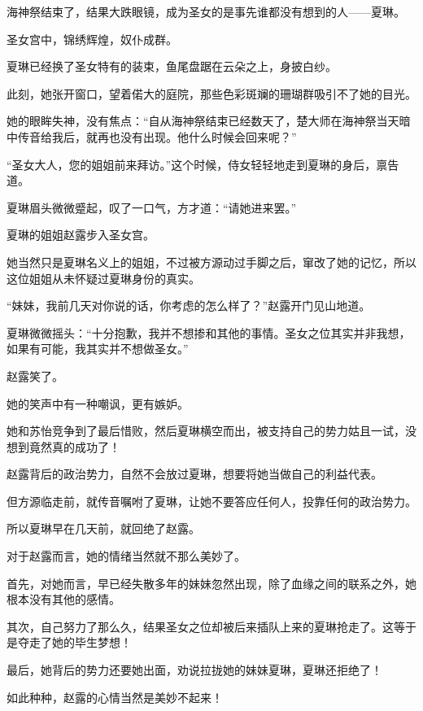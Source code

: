 
\begin{this_body}

海神祭结束了，结果大跌眼镜，成为圣女的是事先谁都没有想到的人——夏琳。

圣女宫中，锦绣辉煌，奴仆成群。

夏琳已经换了圣女特有的装束，鱼尾盘踞在云朵之上，身披白纱。

此刻，她张开窗口，望着偌大的庭院，那些色彩斑斓的珊瑚群吸引不了她的目光。

她的眼眸失神，没有焦点：“自从海神祭结束已经数天了，楚大师在海神祭当天暗中传音给我后，就再也没有出现。他什么时候会回来呢？”

“圣女大人，您的姐姐前来拜访。”这个时候，侍女轻轻地走到夏琳的身后，禀告道。

夏琳眉头微微蹙起，叹了一口气，方才道：“请她进来罢。”

夏琳的姐姐赵露步入圣女宫。

她当然只是夏琳名义上的姐姐，不过被方源动过手脚之后，窜改了她的记忆，所以这位姐姐从未怀疑过夏琳身份的真实。

“妹妹，我前几天对你说的话，你考虑的怎么样了？”赵露开门见山地道。

夏琳微微摇头：“十分抱歉，我并不想掺和其他的事情。圣女之位其实并非我想，如果有可能，我其实并不想做圣女。”

赵露笑了。

她的笑声中有一种嘲讽，更有嫉妒。

她和苏怡竞争到了最后惜败，然后夏琳横空而出，被支持自己的势力姑且一试，没想到竟然真的成功了！

赵露背后的政治势力，自然不会放过夏琳，想要将她当做自己的利益代表。

但方源临走前，就传音嘱咐了夏琳，让她不要答应任何人，投靠任何的政治势力。

所以夏琳早在几天前，就回绝了赵露。

对于赵露而言，她的情绪当然就不那么美妙了。

首先，对她而言，早已经失散多年的妹妹忽然出现，除了血缘之间的联系之外，她根本没有其他的感情。

其次，自己努力了那么久，结果圣女之位却被后来插队上来的夏琳抢走了。这等于是夺走了她的毕生梦想！

最后，她背后的势力还要她出面，劝说拉拢她的妹妹夏琳，夏琳还拒绝了！

如此种种，赵露的心情当然是美妙不起来！


\end{this_body}
